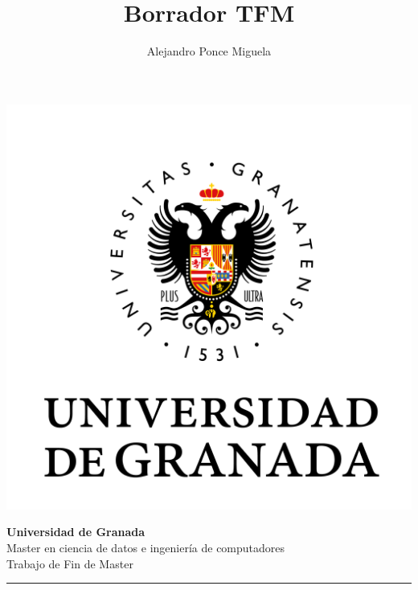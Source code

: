 \documentclass[a4paper,12pt,oneside,titlepage]{book}
\author{Alejandro Ponce Miguela}
\date{}
\title{\textbf{Borrador TFM}}
\begin{document}
\begin{titlepage}
  \begin{center}
      \vspace*{0.1cm}
      \includegraphics[scale=0.4]{img/logous.png}
       
       
       
      \Large\textbf{Universidad de Granada} \\
       
      
       
      Master en ciencia de datos e ingeniería de computadores \\
       
       
       
      Trabajo de Fin de Master \\
      \vspace{0.3cm}
      \rule{16cm}{0.3mm}
      
      \vspace{0.1cm}
      \\


\end{center}
\end{titlepage}
\end{document}
